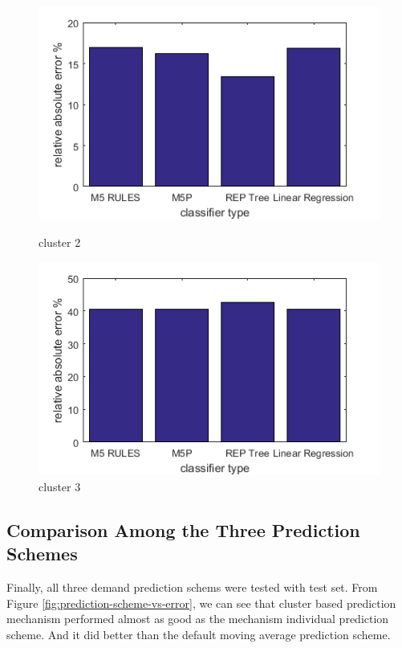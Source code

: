 \begin{figure}
\centering
\begin{minipage}{.5\textwidth}
  \centering
  \includegraphics[width=\linewidth]{cluster-2-diff-classifier-relative-abs.png}
  \caption{cluster 2}
  \label{fig:cluster-2-predictors}
\end{minipage}%
\begin{minipage}{.5\textwidth}
  \centering
  \includegraphics[width=\linewidth]{cluster-3-diff-classifier-relative-abs.png}
  \caption{cluster 3}
\label{fig:cluster-3-predictors}
\end{minipage}

\end{figure}


\subsection{Comparison Among the Three Prediction Schemes}

Finally, all three demand prediction schems were tested with test set. From Figure \ref{fig:prediction-scheme-vs-error}, we can see that cluster based prediction mechanism performed almost as good as the mechanism individual prediction scheme. And it did better than the default moving average prediction scheme.

